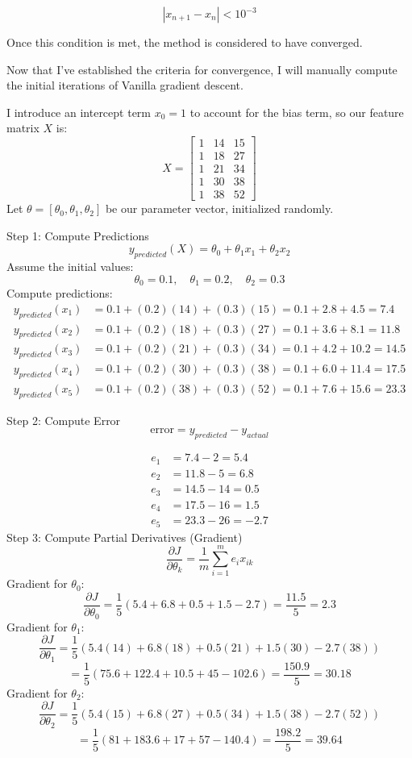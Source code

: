 \documentclass[12pt]{article}
\theoremstyle{definition}
\begin{document}
\[
|x_{n+1} - x_n| < 10^{-3}
\]

Once this condition is met, the method is considered to have converged.  

Now that I've established the criteria for convergence, I will manually compute the initial iterations of Vanilla gradient descent.


I introduce an intercept term \( x_0 = 1 \) to account for the bias term, so our feature matrix \( X \) is:
\[
X =
\begin{bmatrix}
1 & 14 & 15 \\
1 & 18 & 27 \\
1 & 21 & 34 \\
1 & 30 & 38 \\
1 & 38 & 52
\end{bmatrix}
\]
Let \( \theta = [\theta_0, \theta_1, \theta_2] \) be our parameter vector, initialized randomly.

Step 1: Compute Predictions
\[
y_{predicted}(X) = \theta_0 + \theta_1 x_1 + \theta_2 x_2
\]
Assume the initial values:  
\[
\theta_0 = 0.1, \quad \theta_1 = 0.2, \quad \theta_2 = 0.3
\]
Compute predictions:
\[
\begin{aligned}
y_{predicted}(x_1) &= 0.1 + (0.2)(14) + (0.3)(15) = 0.1 + 2.8 + 4.5 = 7.4 \\
y_{predicted}(x_2) &= 0.1 + (0.2)(18) + (0.3)(27) = 0.1 + 3.6 + 8.1 = 11.8 \\
y_{predicted}(x_3) &= 0.1 + (0.2)(21) + (0.3)(34) = 0.1 + 4.2 + 10.2 = 14.5 \\
y_{predicted}(x_4) &= 0.1 + (0.2)(30) + (0.3)(38) = 0.1 + 6.0 + 11.4 = 17.5 \\
y_{predicted}(x_5) &= 0.1 + (0.2)(38) + (0.3)(52) = 0.1 + 7.6 + 15.6 = 23.3
\end{aligned}
\]

Step 2: Compute Error
\[
\text{error} = y_{predicted} - y_{actual}\]

\[
\begin{aligned}
e_1 &= 7.4 - 2 = 5.4 \\
e_2 &= 11.8 - 5 = 6.8 \\
e_3 &= 14.5 - 14 = 0.5 \\
e_4 &= 17.5 - 16 = 1.5 \\
e_5 &= 23.3 - 26 = -2.7
\end{aligned}
\]
Step 3: Compute Partial Derivatives (Gradient)
\[
\frac{\partial J}{\partial \theta_k} = \frac{1}{m} \sum_{i=1}^{m} e_i x_{ik}
\]
Gradient for \( \theta_0 \):
\[
\frac{\partial J}{\partial \theta_0} = \frac{1}{5} (5.4 + 6.8 + 0.5 + 1.5 - 2.7) = \frac{11.5}{5} = 2.3
\]
Gradient for \( \theta_1 \):
\[
\frac{\partial J}{\partial \theta_1} = \frac{1}{5} (5.4(14) + 6.8(18) + 0.5(21) + 1.5(30) - 2.7(38))
\]
\[
= \frac{1}{5} (75.6 + 122.4 + 10.5 + 45 - 102.6) = \frac{150.9}{5} = 30.18
\]
Gradient for \( \theta_2 \):
\[
\frac{\partial J}{\partial \theta_2} = \frac{1}{5} (5.4(15) + 6.8(27) + 0.5(34) + 1.5(38) - 2.7(52))
\]
\[
= \frac{1}{5} (81 + 183.6 + 17 + 57 - 140.4) = \frac{198.2}{5} = 39.64
\]
\end{document}
